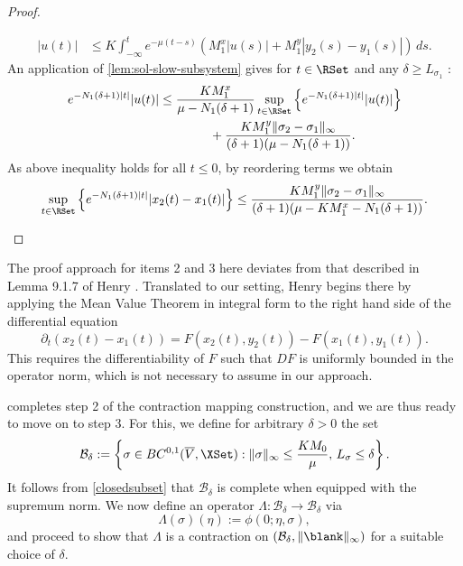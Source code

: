 \documentclass[a4paper]{siamart190516}
\begin{document}
\begin{proof}
\begin{enumerate}
\begin{align*}
|u(t)| &\leq  K \int_{-\infty}^t e^{-\mu(t-s)} \left( M_1^x |u(s)| + M_1^y |y_2(s) - y_1(s)| \right)  \, ds.
\end{align*}
An application of \cref{lem:sol-slow-subsystem} gives for $t \in \RSet$ and any $\delta \geq L_{\sigma_1}$ :
\begin{align*}
e^{-N_1 (\delta + 1) |t|} |u(t)| &\leq \frac{K M_1^x}{\mu-N_1(\delta+1)} \sup_{t \in \RSet} \left\{ e^{-N_1 (\delta + 1) |t|} |u(t)|   \right\} \\
&\qquad  \qquad +\frac{K M_1^y \|\sigma_2-\sigma_1\|_{\infty}}{(\delta +1)(\mu-N_1(\delta +1))}.
\end{align*}
As above inequality holds for all $t \leq 0$, by reordering terms we obtain
\[
\sup_{t \in \RSet} \left\{ e^{-N_1 (\delta+ 1) |t|} |x_2(t) - x_1(t)|   \right\} \leq \frac{K M_1^y  \|\sigma_2 - \sigma_1\|_{\infty}}{(\delta+1)(\mu-K M_1^x-N_1(\delta+1))}.
\]
\end{enumerate}
\end{proof}

\begin{remark}\label{rem:bdd-sol-fast-subsystem}
The proof approach for items 2 and 3 here deviates from that described in Lemma 9.1.7 of Henry \cite{He81}. Translated to our setting, Henry begins there by applying the Mean Value Theorem in integral form to the right hand side of the differential equation
\[
\partial_t (x_2(t) - x_1(t)) = F(x_2(t),y_2(t)) - F(x_1(t),y_1(t)).
\]
This requires the differentiability of $F$ such that $DF$ is uniformly bounded in the operator norm, which is not necessary to assume in our approach.
\end{remark}

 completes step 2 of the contraction mapping construction, and we are thus ready to move on to step 3. For this, we define for arbitrary $\delta > 0$ the set
 \begin{equation}
 \mathcal{B}_{\delta} := \left\{ \sigma \in BC^{0,1}(\overline{V},\XSet): \| \sigma \|_{\infty} \leq \frac{K M_0}{\mu}, \, L_{\sigma} \leq  \delta \right\}.
 \end{equation}
 It follows from \cref{closedsubset} that $\mathcal{B}_{\delta}$ is complete when equipped with the supremum norm. We now define an operator $ \Lambda: \mathcal{B}_{\delta} \rightarrow \mathcal{B}_{\delta}$ via 
 \begin{equation}\label{fast-contraction-map}
\Lambda(\sigma)(\eta) := \phi(0;\eta,\sigma),
 \end{equation}
 and proceed to show that $\Lambda$ is a contraction on $(\mathcal{B}_{\delta}, \| \blank \|_{\infty})$ for a suitable choice of $\delta$. 
 
\end{document}

